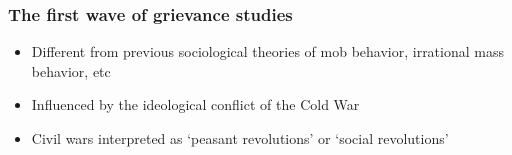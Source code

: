 \documentclass[aspectratio=43]{beamer}
\begin{document}
\begin{frame}
\frametitle{The first wave of grievance studies}
\centering

\begin{itemize}
  \item Different from previous sociological theories of mob behavior, irrational mass behavior, etc
  \item Influenced by the ideological conflict of the Cold War
  \item Civil wars interpreted as `peasant revolutions' or `social revolutions'
\end{itemize}

\end{frame}
\end{document}
